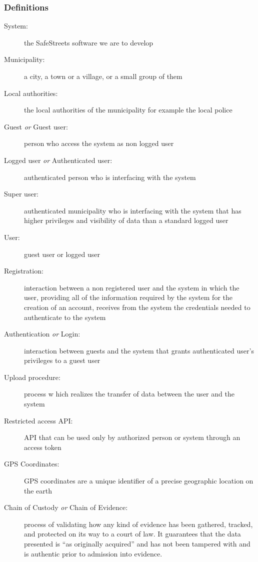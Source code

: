	\subsubsection{Definitions}
	\begin{description}
		\item[System:]the SafeStreets software we are to develop
		\item[Municipality:] a city, a town or a village, or a small group of them
		\item[Local authorities:] the local authorities of the municipality for example the local police
		\item[Guest \emph{or} Guest user:] person who access the system as non logged user
		\item[Logged user \emph{or} Authenticated user:] authenticated person who is interfacing with the system
		\item[Super user:] authenticated municipality who is interfacing with the system that has higher privileges and visibility of data than a standard logged user
		\item[User:] guest user or logged user
		\item[Registration:]  interaction between a non registered user and the system in which the user, providing all of the information required by the system for the creation of an account, receives from the system the credentials needed to authenticate to the system
		\item[Authentication \emph{or} Login:] interaction between guests and the system that grants authenticated user's privileges to a guest user
		\item[Upload procedure:] process w hich realizes the transfer of data between the user and the system
		\item[Restricted access API:] API that can be used only by authorized person or system through an access token
		\item[GPS Coordinates:] GPS coordinates are a unique identifier of a precise geographic location on the earth
		\item[Chain of Custody \emph{or} Chain of Evidence:] process of validating how any kind of evidence has been gathered, tracked, and protected on its way to a court of law. It guarantees that the data presented is “as originally acquired” and has not been tampered with and is authentic prior to admission into evidence.\cite{Stone}
		
	\end{description}
